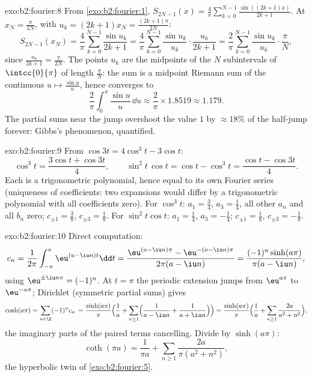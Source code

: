 \begin{solution}{exo:b2:fourier:8}
From \cref{exo:b2:fourier:1}, $S_{2N-1}(x) =
\frac4\pi\sum_{k=0}^{N-1}\frac{\sin((2k+1)x)}{2k+1}$. At $x_N =
\frac{\pi}{2N}$, with $u_k = (2k+1)x_N = \frac{(2k+1)\pi}{2N}$:
\[
S_{2N-1}(x_N) = \frac{4}{\pi}\sum_{k=0}^{N-1}\frac{\sin u_k}{2k+1}
= \frac{4}{\pi}\sum_{k=0}^{N-1}\frac{\sin u_k}{u_k}\cdot
\frac{u_k}{2k+1}
= \frac{2}{\pi}\sum_{k=0}^{N-1}\frac{\sin u_k}{u_k}\cdot
\frac{\pi}{N},
\]
since $\frac{u_k}{2k+1} = \frac{\pi}{2N}$. The points $u_k$ are the
midpoints of the $N$ subintervals of $\intcc{0}{\pi}$ of length
$\frac{\pi}{N}$: the sum is a midpoint Riemann sum of the
continuous $u \mapsto \frac{\sin u}{u}$, hence converges to
\[
\frac{2}{\pi}\int_0^\pi \frac{\sin u}{u}\,\dd u
\approx \frac{2}{\pi}\times 1.8519 \approx 1.179 .
\]
The partial sums near the jump overshoot the value $1$ by $\approx
18\%$ of the half-jump forever: Gibbs's phenomenon, quantified.
\end{solution}

\begin{solution}{exo:b2:fourier:9}
From $\cos 3t = 4\cos^3t - 3\cos t$:
\[
\cos^3 t = \frac{3\cos t + \cos 3t}{4},
\qquad
\sin^2t\,\cos t = \cos t - \cos^3 t
= \frac{\cos t - \cos 3t}{4} .
\]
Each is a trigonometric polynomial, hence equal to its own
Fourier series (uniqueness of coefficients: two expansions
would differ by a trigonometric polynomial with all
coefficients zero). For $\cos^3t$: $a_1 = \frac34$, $a_3 =
\frac14$, all other $a_n$ and all $b_n$ zero; $c_{\pm1} =
\frac38$, $c_{\pm3} = \frac18$. For $\sin^2t\cos t$: $a_1 =
\frac14$, $a_3 = -\frac14$; $c_{\pm1} = \frac18$, $c_{\pm3} =
-\frac18$.
\end{solution}

\begin{solution}{exo:b2:fourier:10}
Direct computation:
\[
c_n = \frac{1}{2\pi}\int_{-\pi}^{\pi}\eu^{(a - \iu n)t}\dd t
= \frac{\eu^{(a-\iu n)\pi} - \eu^{-(a - \iu n)\pi}}
{2\pi(a - \iu n)}
= \frac{(-1)^n\sinh(a\pi)}{\pi(a - \iu n)} ,
\]
using $\eu^{\pm\iu n\pi} = (-1)^n$. At $t = \pi$ the periodic
extension jumps from $\eu^{a\pi}$ to $\eu^{-a\pi}$; Dirichlet
(symmetric partial sums) gives
\[
\cosh(a\pi) = \sum_{n\in\Z}(-1)^n c_n\,
= \frac{\sinh(a\pi)}{\pi}\Bigl(\frac1a +
\sum_{n\geq1}\Bigl(\frac{1}{a - \iu n} +
\frac{1}{a + \iu n}\Bigr)\Bigr)
= \frac{\sinh(a\pi)}{\pi}\Bigl(\frac1a +
\sum_{n\geq1}\frac{2a}{a^2 + n^2}\Bigr) ,
\]
the imaginary parts of the paired terms cancelling. Divide by
$\sinh(a\pi)$:
\[
\coth(\pi a) = \frac{1}{\pi a} +
\sum_{n\geq1}\frac{2a}{\pi(a^2 + n^2)} ,
\]
the hyperbolic twin of \cref{exo:b2:fourier:5}.
\end{solution}

